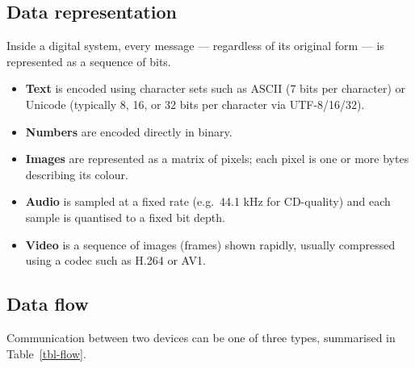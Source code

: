 \documentclass[
  letterpaper,
  DIV=11,
  numbers=noendperiod]{scrreprt}
\providecommand{\tightlist}{%
  \setlength{\itemsep}{0pt}\setlength{\parskip}{0pt}}
\begin{document}
\subsection{Data representation}\label{data-representation}

Inside a digital system, every message --- regardless of its original
form --- is represented as a sequence of bits.

\begin{itemize}
\tightlist
\item
  \textbf{Text} is encoded using character sets such as ASCII (7 bits
  per character) or Unicode (typically 8, 16, or 32 bits per character
  via UTF-8/16/32).
\item
  \textbf{Numbers} are encoded directly in binary.
\item
  \textbf{Images} are represented as a matrix of pixels; each pixel is
  one or more bytes describing its colour.
\item
  \textbf{Audio} is sampled at a fixed rate (e.g.~44.1 kHz for
  CD-quality) and each sample is quantised to a fixed bit depth.
\item
  \textbf{Video} is a sequence of images (frames) shown rapidly, usually
  compressed using a codec such as H.264 or AV1.
\end{itemize}

\subsection{Data flow}\label{data-flow}

Communication between two devices can be one of three types, summarised
in Table~\ref{tbl-flow}.
\end{document}
